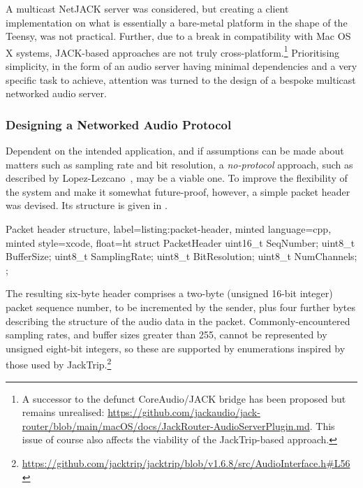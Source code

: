 
A multicast NetJACK server was considered, but creating a client implementation
on what is essentially a bare-metal platform in the shape of the Teensy, was not
practical.
Further, due to a break in compatibility with Mac OS X systems, JACK-based
approaches are not truly cross-platform.\footnote{
    A successor to the defunct CoreAudio/JACK bridge has been proposed but
    remains unrealised:
    \url{https://github.com/jackaudio/jack-router/blob/main/macOS/docs/JackRouter-AudioServerPlugin.md}.
    This issue of course also affects the viability of the JackTrip-based
    approach.
}
Prioritising simplicity, in the form of an audio server having minimal
dependencies and a very specific task to achieve, attention was turned to the
design of a bespoke multicast networked audio server.

\subsubsection{Designing a Networked Audio Protocol}\label{subsubsec:designing-a-protocol}

Dependent on the intended application, and if assumptions can be made about
matters such as sampling rate and bit resolution, a \textit{no-protocol}
approach, such as described by Lopez-Lezcano~\citep{lopez-lezcano_jack_2012},
may be a viable one.
To improve the flexibility of the system and make it somewhat future-proof,
however, a simple packet header was devised.
Its structure is given in .

\begin{codelisting}{
    Packet header structure,
    label=listing:packet-header,
    minted language=cpp,
    minted style=xcode,
    float=ht
}
    struct PacketHeader {
        uint16_t SeqNumber;
        uint8_t BufferSize;
        uint8_t SamplingRate;
        uint8_t BitResolution;
        uint8_t NumChannels;
    };
\end{codelisting}

The resulting six-byte header comprises a two-byte (unsigned 16-bit integer)
packet sequence number, to be incremented by the sender, plus four further bytes
describing the structure of the audio data in the packet.
Commonly-encountered sampling rates, and buffer sizes greater than 255, cannot
be represented by unsigned eight-bit integers, so these are supported by
enumerations inspired by those used by JackTrip.\footnote{
    \url{https://github.com/jacktrip/jacktrip/blob/v1.6.8/src/AudioInterface.h\#L56}
}

